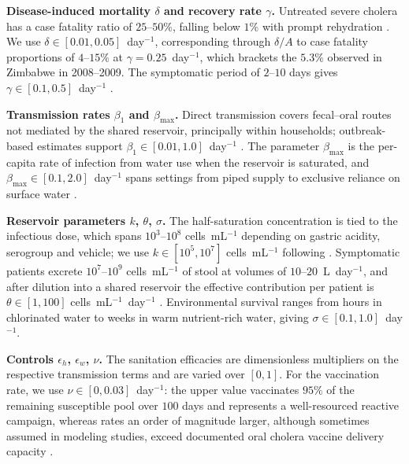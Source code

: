 \documentclass[11pt]{article}
\theoremstyle{plain}
\theoremstyle{definition}
\theoremstyle{remark}
\begin{document}
\textbf{Disease-induced mortality $\delta$ and recovery rate $\gamma$.} Untreated severe cholera has a case fatality ratio of $25$--$50\%$, falling below $1\%$ with prompt rehydration \cite{harris2012cholera}. We use $\delta\in[0.01,0.05]$~day$^{-1}$, corresponding through $\delta/A$ to case fatality proportions of $4$--$15\%$ at $\gamma=0.25$~day$^{-1}$, which brackets the $5.3\%$ observed in Zimbabwe in 2008--2009. The symptomatic period of $2$--$10$ days gives $\gamma\in[0.1,0.5]$~day$^{-1}$ \cite{codeco2001endemic,azman2013incubation}.

\textbf{Transmission rates $\beta_1$ and $\beta_{\max}$.} Direct transmission covers fecal--oral routes not mediated by the shared reservoir, principally within households; outbreak-based estimates support $\beta_1\in[0.01,1.0]$~day$^{-1}$ \cite{tien2010multiple,mukandavire2011estimating}. The parameter $\beta_{\max}$ is the per-capita rate of infection from water use when the reservoir is saturated, and $\beta_{\max}\in[0.1,2.0]$~day$^{-1}$ spans settings from piped supply to exclusive reliance on surface water \cite{capasso1979mathematical}.

\textbf{Reservoir parameters $k$, $\theta$, $\sigma$.} The half-saturation concentration is tied to the infectious dose, which spans $10^3$--$10^8$ cells~mL$^{-1}$ depending on gastric acidity, serogroup and vehicle; we use $k\in[10^5,10^7]$ cells~mL$^{-1}$ following \cite{codeco2001endemic}. Symptomatic patients excrete $10^7$--$10^9$ cells~mL$^{-1}$ of stool at volumes of $10$--$20$~L~day$^{-1}$, and after dilution into a shared reservoir the effective contribution per patient is $\theta\in[1,100]$ cells~mL$^{-1}$~day$^{-1}$ \cite{nelson2009transmission}. Environmental survival ranges from hours in chlorinated water to weeks in warm nutrient-rich water, giving $\sigma\in[0.1,1.0]$~day$^{-1}$.

\textbf{Controls $\epsilon_h$, $\epsilon_w$, $\nu$.} The sanitation efficacies are dimensionless multipliers on the respective transmission terms and are varied over $[0,1]$. For the vaccination rate, we use $\nu\in[0,0.03]$~day$^{-1}$: the upper value vaccinates $95\%$ of the remaining susceptible pool over $100$ days and represents a well-resourced reactive campaign, whereas rates an order of magnitude larger, although sometimes assumed in modeling studies, exceed documented oral cholera vaccine delivery capacity \cite{azman2015impact,who2017cholera}.
\end{document}
